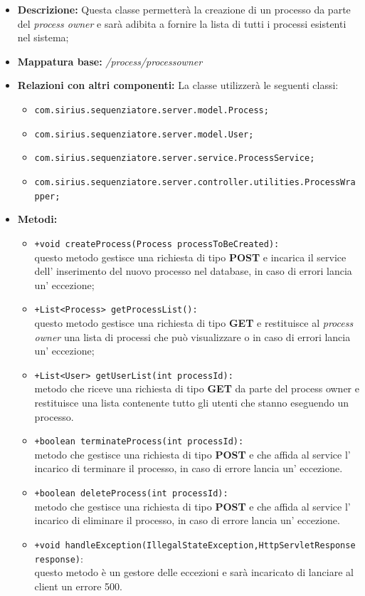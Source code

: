 \begin{itemize}
	\item \textbf{Descrizione: } Questa classe permetterà la creazione di un processo da parte del \textit{process owner} e sarà adibita a fornire la lista di tutti i processi esistenti nel sistema;
	\item \textbf{Mappatura base: } \textit{\slash process\slash processowner}
	\item \textbf{Relazioni con altri componenti: }
	La classe utilizzerà le seguenti classi:
	\begin{itemize}
		\item \texttt{com.sirius.sequenziatore.server.model.Process;}
		\item \texttt{com.sirius.sequenziatore.server.model.User;}
		\item \texttt{com.sirius.sequenziatore.server.service.ProcessService;}
		\item \texttt{com.sirius.sequenziatore.server.controller.utilities.ProcessWrapper;}
	\end{itemize}
	\item \textbf{Metodi: }
				\begin{itemize}
					\item \texttt{+void createProcess(Process processToBeCreated):}\\
					questo metodo gestisce una richiesta di tipo \textbf{POST} e incarica il service dell' inserimento del nuovo processo nel database, in caso di errori lancia un' eccezione;
					\item \texttt{+List<Process> getProcessList():}\\
					 questo metodo gestisce una richiesta di tipo \textbf{GET} e restituisce al \textit{process owner} una lista di processi che può visualizzare o in caso di errori lancia un' eccezione;
					 \item \texttt{+List<User> getUserList(int processId):}\\
					 metodo che riceve una richiesta di tipo \textbf{GET} da parte del process owner e restituisce una lista contenente tutto gli utenti che stanno eseguendo un processo.
					 \item \texttt{+boolean terminateProcess(int processId):}\\
					 metodo che gestisce una richiesta di tipo \textbf{POST} e che affida al service l' incarico di terminare il processo, in caso di errore lancia un' eccezione.
					 \item \texttt{+boolean deleteProcess(int processId):}\\
					 metodo che gestisce una richiesta di tipo \textbf{POST} e che affida al service l' incarico di eliminare il processo, in caso di errore lancia un' eccezione.
					  \item \texttt{+void handleException(IllegalStateException,HttpServletResponse response)}:\\
					 questo metodo è un gestore delle eccezioni e sarà incaricato di lanciare al client un errore 500.
				\end{itemize}
\end{itemize}
